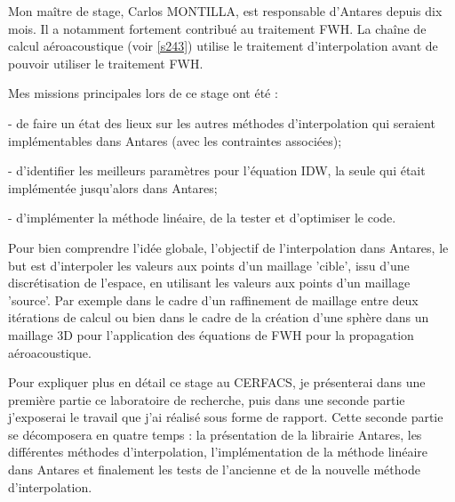 Mon maître de stage, Carlos MONTILLA, est responsable d'Antares depuis dix mois. Il a notamment fortement contribué au traitement \ac{FWH}. La chaîne de calcul aéroacoustique (voir \ref{s243}) utilise le traitement d'interpolation avant de pouvoir utiliser le traitement FWH.

Mes missions principales lors de ce stage ont été :

- de faire un état des lieux sur les autres méthodes d'interpolation qui seraient 
implémentables dans Antares (avec les contraintes associées);

- d'identifier les meilleurs paramètres pour l'équation \ac{IDW}, la seule qui était implémentée jusqu'alors dans Antares; %

- d'implémenter la méthode linéaire, de la tester et d'optimiser le code.  %

Pour bien comprendre l'idée globale, l'objectif de l'interpolation dans Antares, le but est d'interpoler les valeurs aux points d'un maillage 'cible', issu d'une discrétisation de l'espace, en utilisant les valeurs aux points d'un maillage 'source'.
Par exemple dans le cadre d'un raffinement de maillage entre deux itérations de calcul ou bien dans le cadre de la création d'une sphère dans un maillage 3D pour l'application des équations de FWH pour la propagation aéroacoustique.

Pour expliquer plus en détail ce stage au CERFACS, je présenterai dans une première partie ce laboratoire de recherche, puis dans une seconde partie j'exposerai le travail que j'ai réalisé sous forme de rapport. Cette seconde partie se décomposera en quatre temps : la présentation de la librairie Antares, les différentes méthodes d'interpolation, l'implémentation de la méthode linéaire dans Antares et finalement les tests de l'ancienne et de la nouvelle méthode d'interpolation.